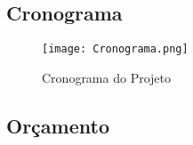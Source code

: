        \subsection{Cronograma }
       \begin{figure}[H]
              \begin{center}
                  \caption{Cronograma do Projeto } \label{afp}
                  \texttt{[image: Cronograma.png]} \\
               
              \end{center}
             \end{figure}
          
       \subsection{Or\c{c}amento }
